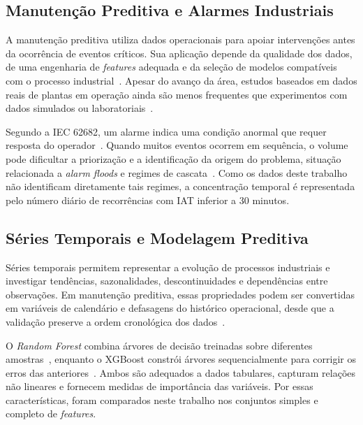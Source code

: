 \subsection{Manutenção Preditiva e Alarmes Industriais}

A manutenção preditiva utiliza dados operacionais para apoiar intervenções antes da ocorrência de eventos críticos. Sua aplicação depende da qualidade dos dados, de uma engenharia de \textit{features} adequada e da seleção de modelos compatíveis com o processo industrial~\cite{pdm_models,carvalho2019systematic,hector2024predictive}. Apesar do avanço da área, estudos baseados em dados reais de plantas em operação ainda são menos frequentes que experimentos com dados simulados ou laboratoriais~\cite{pdm4.0}.

Segundo a IEC 62682, um alarme indica uma condição anormal que requer resposta do operador~\cite{iec62682_2022}. Quando muitos eventos ocorrem em sequência, o volume pode dificultar a priorização e a identificação da origem do problema, situação relacionada a \textit{alarm floods} e regimes de cascata~\cite{isa18_2_2009,rahaman2025alarmfloods}. Como os dados deste trabalho não identificam diretamente tais regimes, a concentração temporal é representada pelo número diário de recorrências com IAT inferior a 30 minutos.

\subsection{Séries Temporais e Modelagem Preditiva}

Séries temporais permitem representar a evolução de processos industriais e investigar tendências, sazonalidades, descontinuidades e dependências entre observações. Em manutenção preditiva, essas propriedades podem ser convertidas em variáveis de calendário e defasagens do histórico operacional, desde que a validação preserve a ordem cronológica dos dados~\cite{pdm_time_series,farahani2024timeseries}.

O \textit{Random Forest} combina árvores de decisão treinadas sobre diferentes amostras~\cite{breiman2001randomforest,biau2012randomforests}, enquanto o XGBoost constrói árvores sequencialmente para corrigir os erros das anteriores~\cite{chen2016xgboost}. Ambos são adequados a dados tabulares, capturam relações não lineares e fornecem medidas de importância das variáveis. Por essas características, foram comparados neste trabalho nos conjuntos simples e completo de \textit{features}.

